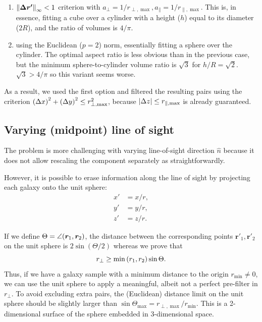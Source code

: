\begin{enumerate}
    \item $\norm{\bm{\Delta r'}}_\infty<1$ criterion with $a_\perp = 1/r_{\perp,\max},a_\parallel = 1/r_{\parallel,\max}$.
    This is, in essence, fitting a cube over a cylinder with a height ($h$) equal to its diameter ($2R$), and the ratio of volumes is $4/\pi$.
    \item using the Euclidean ($p=2$) norm, essentially fitting a sphere over the cylinder.
    The optimal aspect ratio is less obvious than in the previous case, but the minimum sphere-to-cylinder volume ratio is $\sqrt{3}$ for $h/R=\sqrt{2}$.
    $\sqrt{3}>4/\pi$ so this variant seems worse.
\end{enumerate}

As a result, we used the first option and filtered the resulting pairs using the criterion $\qty(\Delta x)^2 + \qty(\Delta y)^2 \le r_{\perp,\max}^2$, because $\abs{\Delta z}\le r_{\parallel,\max}$ is already guaranteed.

\subsection{Varying (midpoint) line of sight}

The problem is more challenging with varying line-of-sight direction $\hat n$ because it does not allow rescaling the component separately as straightforwardly.

However, it is possible to erase information along the line of sight by projecting each galaxy onto the unit sphere:
\begin{align}
    x' &= x/r, \\
    y' &= y/r, \\
    z' &= z/r.
\end{align}

If we define $\Theta = \angle\qty(\bm r_1, \bm r_2)$, the distance between the corresponding points $\bm r'_1,\bm r'_2$ on the unit sphere is $2\sin(\Theta/2)$ whereas we prove that
\begin{equation}
    r_\perp \ge \min\qty(r_1, r_2) \sin\Theta.
\end{equation}
Thus, if we have a galaxy sample with a minimum distance to the origin $r_{\min}\ne 0$, we can use the unit sphere to apply a meaningful, albeit not a perfect pre-filter in $r_\perp$.
To avoid excluding extra pairs, the (Euclidean) distance limit on the unit sphere should be slightly larger than $\sin\Theta_{\max} = r_{\perp,\max}/r_{\min}$.
This is a 2-dimensional surface of the sphere embedded in 3-dimensional space.

